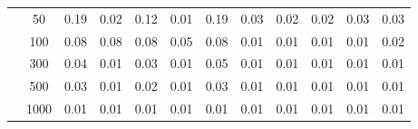 \documentclass[a4paper,11pt]{article} %
\begin{document}
\begin{table}[H]
\begin{tabular}{c|c|c|c|c|c|c|c|c|c|c|c}
               & 50     &  0.19 & 0.02  &  0.12 & 0.01 & 0.19  & 0.03  & 0.02  & 0.02   & 0.03   & 0.03   \\
               & 100    &  0.08 & 0.08  &  0.08 & 0.05 & 0.08  & 0.01  & 0.01  & 0.01   & 0.01   & 0.02    \\
               & 300    &  0.04 & 0.01  &  0.03 & 0.01 & 0.05  & 0.01  & 0.01  & 0.01   & 0.01   & 0.01    \\
               & 500    &  0.03 & 0.01  &  0.02 & 0.01 & 0.03  & 0.01  & 0.01  & 0.01   & 0.01   & 0.01    \\
               & 1000   &  0.01 & 0.01  &  0.01 & 0.01 & 0.01  & 0.01  & 0.01  & 0.01   & 0.01   & 0.01    \\
    \hline \hline
    \end{tabular}
    \label{tab:inverted2}
\end{table}
\end{document}
